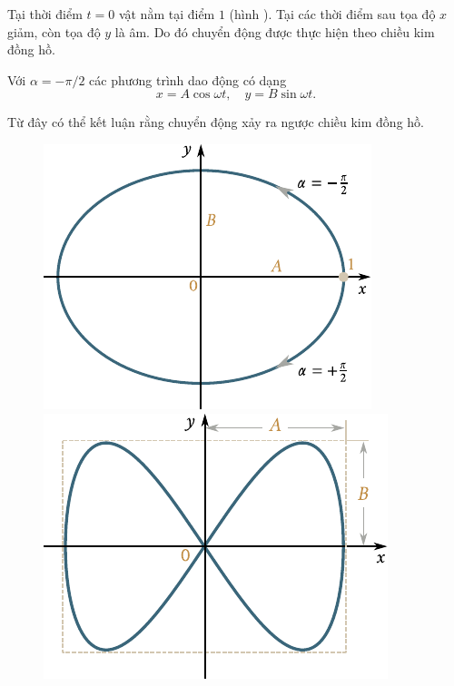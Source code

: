 \begin{enumerate}[1.]
	\noindent
	Tại thời điểm $t=0$ vật nằm tại điểm $1$ (hình ). Tại các thời điểm sau tọa độ $x$ giảm, còn tọa độ $y$ là âm. Do đó chuyển động được thực hiện theo chiều kim đồng hồ.

	Với $\alpha=-\pi/2$ các phương trình dao động có dạng
	\begin{equation}\label{eq:7_96}
		x = A\cos\omega t,\quad y = B\sin\omega t.
	\end{equation}

	\noindent
	Từ đây có thể kết luận rằng chuyển động xảy ra ngược chiều kim đồng hồ.
\end{enumerate}

\begin{figure}[!htb]
	\begin{minipage}[t]{0.5\linewidth}
		\begin{center}
			\includegraphics[scale=0.95]{figures/ch_07/fig_7_15.pdf}
			\caption[]{}
			\label{fig:7_15}
		\end{center}
	\end{minipage}
	\hspace{-0.0cm}
	\begin{minipage}[t]{0.5\linewidth}
		\begin{center}
			\includegraphics[scale=0.95]{figures/ch_07/fig_7_16.pdf}
			\caption[]{}
			\label{fig:7_16}
		\end{center}
	\end{minipage}
\end{figure}

